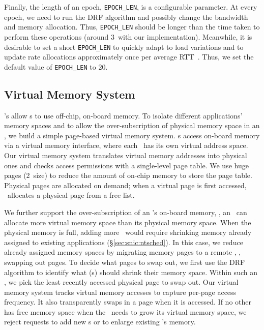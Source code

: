 Finally, the length of an epoch, \texttt{EPOCH\_LEN}, is a configurable parameter.
At every epoch, we need to run the DRF algorithm and possibly change the bandwidth and memory allocation.
Thus, \texttt{EPOCH\_LEN} should be longer than the time taken to perform these operations (around 3\mus\ with our implementation).
Meanwhile, it is desirable to set a short \texttt{EPOCH\_LEN} to quickly adapt to load variations and to update rate allocations approximately once per average RTT~\cite{xcp-sigcomm02, rcp-sigcomm06}.
Thus, we set the default value of \texttt{EPOCH\_LEN} to 20\mus.

\subsection{Virtual Memory System}
\label{sec:snic:memory}
\snic's allow \nt{}s to use off-chip, on-board memory.
To isolate different applications' memory spaces and to allow the over-subscription of physical memory space in an \snic, we build a simple page-based virtual memory system.
\nt{}s access on-board memory via a virtual memory interface,
where each \nt\ has its own virtual address space.
Our virtual memory system translates virtual memory addresses into physical ones and checks access permissions with a single-level page table.
We use huge pages (2\MB\ size) to reduce the amount of on-chip memory to store the page table.
Physical pages are allocated on demand; when a virtual page is first accessed, \snic\ allocates a physical page from a free list.

We further support the over-subscription of an \snic's on-board memory, \ie, an \snic\ can allocate more virtual memory space than its physical memory space.
When the physical memory is full, adding more \nt\ would require shrinking memory already assigned to existing applications (\S\ref{sec:snic:ntsched}).
In this case, we reduce already assigned memory spaces by migrating memory pages to a remote \snic, \ie, swapping out pages.
To decide what pages to swap out, we first use the DRF algorithm to identify what \nt{}(s) should shrink their memory space. 
Within such an \nt, we pick the least recently accessed physical page to swap out.
Our virtual memory system tracks virtual memory accesses to capture per-page access frequency. 
It also transparently swaps in a page when it is accessed.
If no other \snic{} has free memory space when the \snic\ needs to grow its virtual memory space, we reject requests to add new \nt{}s or to enlarge existing \nt{}'s memory.